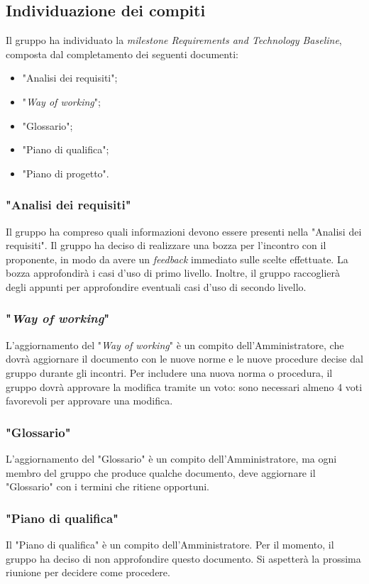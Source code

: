 \subsection{Individuazione dei compiti}
Il gruppo ha individuato la  \textit{milestone Requirements and Technology
	Baseline}, composta dal completamento dei seguenti documenti:
\begin{itemize}
	\item "Analisi dei requisiti";
	\item "\textit{Way of working}";
	\item "Glossario";
	\item "Piano di qualifica";
	\item "Piano di progetto".
\end{itemize}

\subsubsection{"Analisi dei requisiti"}
Il gruppo ha compreso quali informazioni devono essere presenti nella "Analisi
dei requisiti". Il gruppo ha deciso di realizzare
una bozza per l'incontro con il proponente, in modo da avere un
\textit{feedback} immediato sulle scelte effettuate. La bozza approfondirà i
casi d'uso di primo livello. Inoltre, il gruppo raccoglierà degli appunti per
approfondire eventuali casi d'uso di secondo livello.

\subsubsection{"\textit{Way of working}"}
L'aggiornamento del "\textit{Way of working}" è un compito dell'Amministratore,
che dovrà aggiornare il documento con le nuove norme e le nuove procedure
decise dal gruppo durante gli incontri. Per includere una nuova norma o
procedura, il gruppo dovrà approvare la modifica tramite un voto: sono
necessari almeno 4 voti favorevoli per approvare una modifica.

\subsubsection{"Glossario"}
L'aggiornamento del "Glossario" è un compito dell'Amministratore, ma ogni membro
del gruppo che produce qualche documento, deve aggiornare il "Glossario" con i
termini che ritiene opportuni.

\subsubsection{"Piano di qualifica"}
Il "Piano di qualifica" è un compito dell'Amministratore. Per il momento, il
gruppo ha deciso di non approfondire questo documento. Si aspetterà la prossima
riunione per decidere come procedere.

